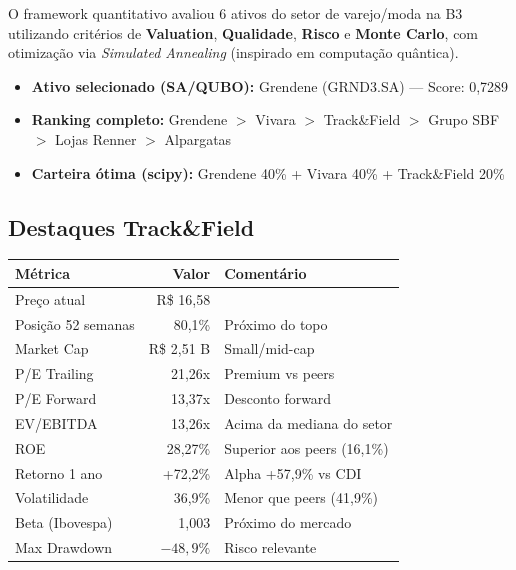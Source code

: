 \documentclass[12pt, a4paper]{article}
\begin{document}
O framework quantitativo avaliou 6 ativos do setor de varejo/moda na B3 utilizando critérios de \textbf{Valuation}, \textbf{Qualidade}, \textbf{Risco} e \textbf{Monte Carlo}, com otimização via \textit{Simulated Annealing} (inspirado em computação quântica).

\begin{itemize}[leftmargin=*]
    \item \textbf{Ativo selecionado (SA/QUBO):} Grendene (GRND3.SA) --- Score: 0,7289
    \item \textbf{Ranking completo:} Grendene $>$ Vivara $>$ Track\&Field $>$ Grupo SBF $>$ Lojas Renner $>$ Alpargatas
    \item \textbf{Carteira ótima (scipy):} Grendene 40\% + Vivara 40\% + Track\&Field 20\%
\end{itemize}

\subsection{Destaques Track\&Field}

\begin{center}
\begin{tabular}{lrl}
\toprule
\textbf{Métrica} & \textbf{Valor} & \textbf{Comentário} \\
\midrule
Preço atual & R\$ 16,58 & \\
Posição 52 semanas & 80,1\% & Próximo do topo \\
Market Cap & R\$ 2,51 B & Small/mid-cap \\
P/E Trailing & 21,26x & Premium vs peers \\
P/E Forward & 13,37x & Desconto forward \\
EV/EBITDA & 13,26x & Acima da mediana do setor \\
ROE & 28,27\% & \textcolor{verdepositivo}{Superior aos peers (16,1\%)} \\
Retorno 1 ano & +72,2\% & \textcolor{verdepositivo}{Alpha +57,9\% vs CDI} \\
Volatilidade & 36,9\% & \textcolor{verdepositivo}{Menor que peers (41,9\%)} \\
Beta (Ibovespa) & 1,003 & Próximo do mercado \\
Max Drawdown & $-48,9\%$ & Risco relevante \\
\bottomrule
\end{tabular}
\end{center}

\end{document}
